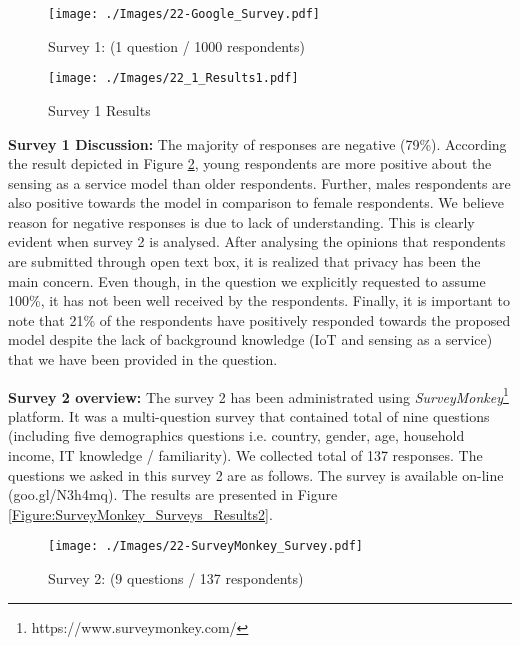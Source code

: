 \documentclass[conference]{IEEEtran}
\begin{document}
\begin{figure}[h]
 \centering
\texttt{[image: ./Images/22-Google\_Survey.pdf]}
\vspace{-0.33cm}	
 \caption{Survey 1: (1 question / 1000 respondents)}
 \label{Figure:Google_Consumer_Surveys}	
\vspace{-0.33cm}	
\end{figure}


\begin{figure}[t]
 \centering
\texttt{[image: ./Images/22\_1\_Results1.pdf]}
\vspace{-0.33cm}	
 \caption{Survey 1 Results}
 \label{Figure:Google_Consumer_Surveys_Results1}	
\vspace{-0.72cm}	
\end{figure}


\textbf{Survey 1 Discussion:} The majority of responses are negative (79\%). According the result depicted in Figure \ref{Figure:Google_Consumer_Surveys_Results1}, young respondents are more positive about the sensing as a service model than older respondents. Further, males respondents are also positive towards the model in comparison to female respondents. We believe reason for negative responses is due to lack of understanding. This is clearly evident when survey 2 is analysed. After analysing the opinions that respondents are submitted through open text box, it is realized that privacy has been the main concern. Even though, in the question we explicitly requested to assume 100\%, it has not been well received by the respondents. Finally, it is important to note that 21\% of the respondents have positively responded towards the proposed model despite the lack of background knowledge (IoT and sensing as a service) that we have been provided in the question.



\textbf{Survey 2 overview:}  The survey 2 has been administrated using  \textit{SurveyMonkey}\footnote{https://www.surveymonkey.com/} platform. It was a multi-question survey that contained total of nine questions (including five demographics questions i.e. country, gender, age, household income, IT knowledge / familiarity). We collected total of 137 responses. The questions we asked in this survey 2 are as follows. The survey is available on-line (goo.gl/N3h4mq). The results are presented in Figure \ref{Figure:SurveyMonkey_Surveys_Results2}.

\begin{figure}[h]
 \centering
\texttt{[image: ./Images/22-SurveyMonkey\_Survey.pdf]}
\caption{Survey 2: (9 questions / 137 respondents)}
 \label{Figure:SurveyMonkey_Surveys}	
\vspace{-0.44cm}	
\end{figure}
\end{document}
